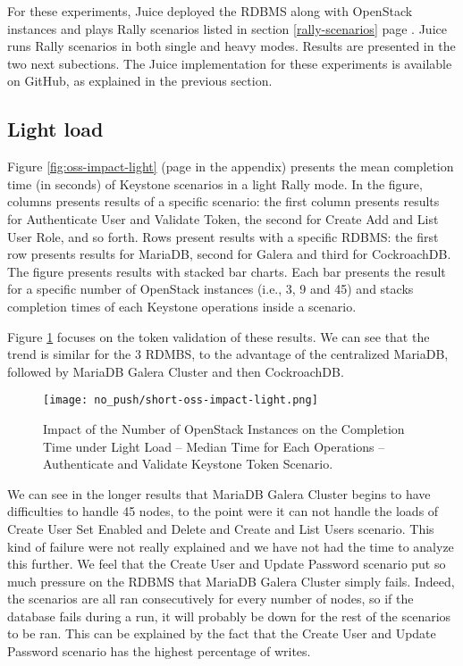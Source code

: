 For these experiments, Juice deployed the RDBMS along with OpenStack instances and plays Rally scenarios listed in section \ref{rally-scenarios} page \pageref{rally-scenarios}. Juice runs Rally scenarios in both single and heavy modes. Results are presented in the two next subections. The Juice implementation for these experiments is available on GitHub, as explained in the previous section.


\subsection{Light load}

Figure \ref{fig:oss-impact-light} (page \pageref{fig:oss-impact-light} in the appendix) presents the mean completion time (in seconds) of Keystone scenarios in a light Rally mode. In the figure, columns presents results of a specific scenario: the first column presents results for Authenticate User and Validate Token, the second for Create Add and List User Role, and so forth. Rows present results with a specific RDBMS: the first row presents results for MariaDB, second for Galera and third for CockroachDB. The figure presents results with stacked bar charts. Each bar presents the result for a specific number of OpenStack instances (i.e., 3, 9 and 45) and stacks completion times of each Keystone operations inside a scenario.


Figure \ref{fig:short-oss-impact-light} focuses on the token validation of these results. We can see that the trend is similar for the 3 RDMBS, to the advantage of the centralized MariaDB, followed by MariaDB Galera Cluster and then CockroachDB.
\begin{figure}[H]
  \vspace{-10pt}
  \centering
  \centerline{\texttt{[image: no\_push/short-oss-impact-light.png]}}
  \vspace{-5pt}
  \caption{Impact of the Number of OpenStack Instances on the Completion Time under Light Load – Median Time for Each Operations – Authenticate and Validate Keystone Token Scenario.}
  \vspace{-5pt}
  \label{fig:short-oss-impact-light}
\end{figure}

We can see in the longer results that MariaDB Galera Cluster begins to have difficulties to handle 45 nodes, to the point were it can not handle the loads of Create User Set Enabled and Delete and Create and List Users scenario. This kind of failure were not really explained and we have not had the time to analyze this further. We feel that the Create User and Update Password scenario put so much pressure on the RDBMS that MariaDB Galera Cluster simply fails. Indeed, the scenarios are all ran consecutively for every number of nodes, so if the database fails during a run, it will probably be down for the rest of the scenarios to be ran. This can be explained by the fact that the Create User and Update Password scenario has the highest percentage of writes.

